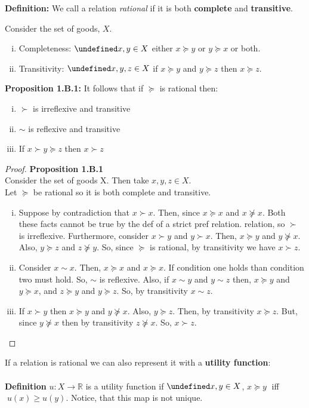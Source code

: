 \documentclass[12pt]{article}
\newcommand{\R}{\mathbb{R}}
\let\oldforall\forall
\let\forall\undefined
\DeclareMathOperator{\forall}{\,\oldforall\,}
\begin{document}
\textbf{Definition:} We call a relation \emph{rational} if it is both \textbf{complete} and \textbf{transitive}.

Consider the set of goods, $X$.
\begin{enumerate}[i.]
	\item Completeness: $\forall x,y \in X$ either $x \succeq y$ or $y \succeq x$ or both.
	\item Transitivity: $\forall x,y,z \in X$ if $x \succeq y$ and $y \succeq z$ then $x \succeq z$.
\end{enumerate}

\textbf{Proposition 1.B.1:} It follows that if $\succeq$ is rational then:
\begin{enumerate}[i.]
\item $\succ$ is irreflexive and transitive
\item $\sim$ is reflexive and transitive
\item If $x \succ y \succeq z$ then $x \succ z$
\end{enumerate}


\begin{proof} \textbf{Proposition 1.B.1}
\\Consider the set of goods X. Then take $x,y,z \in X$. 
\\Let $\succeq$ be rational so it is both complete and transitive.
\begin{enumerate}[i.]
\item Suppose by contradiction that $x \succ x$. Then, since $x \succeq x$ and $x \not\succeq x$. Both these facts cannot be true by the def of a strict pref relation. relation, so $\succ$ is irreflexive. Furthermore, consider $x \succ y$ and $y \succ x$. Then, $ x \succeq y$ and $y \not\succeq x$. Also, $ y \succeq z$ and $z \not\succeq y$. So, since $\succeq$ is rational, by transitivity we have $x \succ z$.
\item Consider $x \sim x$. Then,  $x \succeq x$ and $x \succeq x$. If condition one holds than condition two must hold. So, $\sim$ is reflexive. Also, if $x \sim y$ and $y \sim z$ then, $x \succeq y$ and $y \succeq x$, and $z \succeq y$ and $y \succeq z$. So, by transitivity $x \sim z$.
\item If $x \succ y $ then $x \succeq y$ and $y \not\succeq x$. Also, $y \succeq z$. Then, by transitivity $x \succeq z$. But, since $y \not\succeq x$ then by transitivity $z \not\succeq x$. So, $x \succ z$.
\end{enumerate}
\end{proof}
\noindent
If a relation is rational we can also represent it with a \textbf{utility function}:
\\\textbf{\\Definition} $u: X \rightarrow \R$ is a utility function if $\forall x,y \in X$, $x\succeq y \; $ iff $ \; u(x) \geq u(y)$.
Notice, that this map is not unique.
\end{document}
